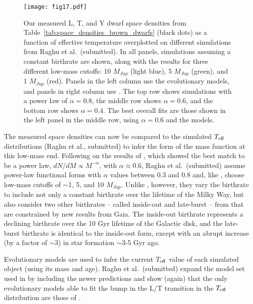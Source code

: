\documentclass[twocolumn,tighten,twocolappendix]{aastex631}
\begin{document}
\begin{figure}
\texttt{[image: fig17.pdf]}
\caption{Our measured L, T, and Y dwarf space densities from Table~\ref{tab:space_densities_brown_dwarfs} (black dots) as a function of effective temperature overplotted on different simulations from Raghu et al.\ (submitted). In all panels, simulations assuming a constant birthrate are shown, along with the results for three different low-mass cutoffs: 10 $M_{Jup}$ (light blue), 5 $M_{Jup}$ (green), and 1 $M_{Jup}$ (red). Panels in the left column use the \cite{saumon2008} evolutionary models, and panels in right column use \cite{baraffe2003}. The top row shows simulations with a power law of $\alpha = 0.8$, the middle row shows $\alpha = 0.6$, and the bottom row shows $\alpha = 0.4$. The best overall fits are those shown in the left panel in the middle row, using $\alpha = 0.6$ and the \cite{saumon2008} models.
\label{fig:space_densities_brown_dwarfs}}
\end{figure}
 
The measured space densities can now be compared to the simulated $T_{\rm eff}$ distributions (Raghu et al., submitted) to infer the form of the mass function at this low-mass end. Following on the results of \cite{kirkpatrick2021}, which showed the best match to be a power law, $dN/dM \propto M^{-\alpha}$, with $\alpha \approx 0.6$, Raghu et al.\ (submitted) assume power-law functional forms with $\alpha$ values between 0.3 and 0.8 and, like \cite{kirkpatrick2021}, choose low-mass cutoffs of $\sim$1, 5, and 10 $M_{Jup}$. Unlike \cite{kirkpatrick2021}, however, they vary the birthrate to include not only a constant birthrate over the lifetime of the Milky Way, but also consider two other birthrates -- called inside-out and late-burst -- from \cite{johnson2021} that are constrained by new results from Gaia. The inside-out birthrate represents a declining birthrate over the 10 Gyr lifetime of the Galactic disk, and the late-burst birthrate is identical to  the inside-out form, except with an abrupt increase (by a factor of $\sim$3) in star formation $\sim$3-5 Gyr ago. 

Evolutionary models are used to infer the current $T_{\rm eff}$ value of each simulated object (using its mass and age). Raghu et al.\ (submitted) expand the model set used in \cite{kirkpatrick2021} by including the newer \cite{marley2021} predictions and show (again) that the only evolutionary models able to fit the bump in the L/T transition in the $T_{\rm eff}$ distribution are those of \cite{saumon2008}. 
\end{document}

